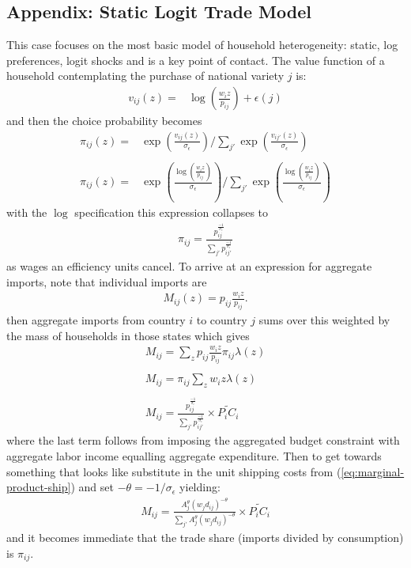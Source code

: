 \documentclass[12pt,pdftex]{article}
\begin{document}
\begin{onehalfspacing}


\section{Appendix: Static Logit Trade Model}

This case focuses on the most basic model of household heterogeneity: static, log preferences, logit shocks and is a key point of contact.  The value function of a household contemplating the purchase of national variety $j$ is:
\begin{align}
v_{ij}( z ) = &   \log\left( \frac{w_{i} z}{p_{ij}} \right) + \epsilon(j)
\end{align}
and then the choice probability becomes
\begin{align}
\pi_{ij}(z) = & \exp \left( \frac{ v_{ij}(z) }{\sigma_{\epsilon}} \right) \Bigg / \sum_{j'} \exp \left( \frac{ v_{ij'}(z) }{\sigma_{\epsilon}} \right) \\
\nonumber\\
\pi_{ij}(z) = & \exp \left( \frac{ \log\left( \frac{w_{i}z}{p_{ij}} \right) }{\sigma_{\epsilon}} \right) \Bigg / \sum_{j'} \exp \left( \frac{  \log\left( \frac{w_{i}z}{p_{ij}} \right) }{\sigma_{\epsilon}} \right)
\end{align}
with the $\log$ specification this expression collapses to
\begin{align}
\pi_{ij} = \frac{p_{ij}^{\frac{-1}{\sigma_{\epsilon}}}}{\sum_{j'} p_{ij'}^{\frac{-1}{\sigma_{\epsilon}}}}
\end{align}
as wages an efficiency units cancel. To arrive at an expression for aggregate imports, note that individual imports are
\begin{align}
M_{ij}(z) = p_{ij} \frac{w_{i}z}{p_{ij}}.
\end{align}
then aggregate imports from country $i$ to country $j$ sums over this weighted by the mass of households in those states which gives
\begin{align}
M_{ij} = \sum_{z} p_{ij} \frac{w_{i}z}{p_{ij}} \pi_{ij} \lambda(z) \\
\nonumber \\
M_{ij} = \pi_{ij} \sum_{z} w_{i}z \lambda(z)\\
\nonumber \\
M_{ij} =  \frac{p_{ij}^{\frac{-1}{\sigma_{\epsilon}}}}{\sum_{j'} p_{ij'}^{\frac{-1}{\sigma_{\epsilon}}}} \times \widetilde{P_{i} C_{i}}
\end{align}
where the last term follows from imposing the aggregated budget constraint with aggregate labor income equalling aggregate expenditure. Then to get towards something that looks like \citet{eaton2002technology} substitute in the unit shipping costs from (\ref{eq:marginal-product-ship}) and set $-\theta = -1/ \sigma_{\epsilon}$ yielding:
\begin{align}
M_{ij} =  \frac{A_j^{\theta}(w_jd_{ij})^{-\theta}}{\sum_{j'} A_j^{\theta}(w_jd_{ij})^{-\theta}} \times \widetilde{P_{i} C_{i}}
\end{align}
and it becomes immediate that the trade share (imports divided by consumption) is $\pi_{ij}$. 


\end{onehalfspacing}
\end{document}

